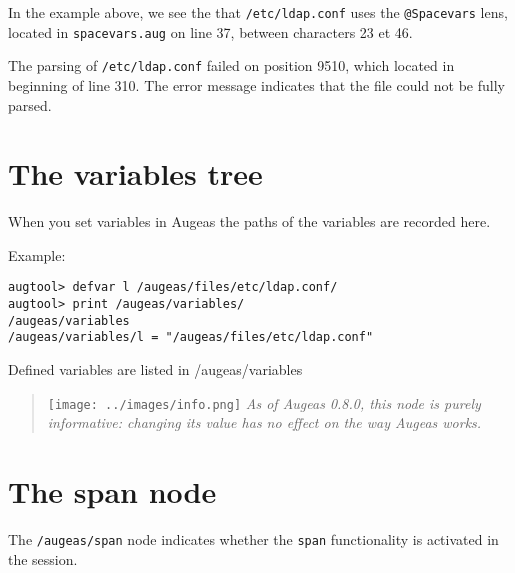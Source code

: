 In the example above, we see the that \nolinkurl{/etc/ldap.conf} uses the \verb!@Spacevars! lens, located in \verb!spacevars.aug! on line 37, between characters 23 et 46.

The parsing of \nolinkurl{/etc/ldap.conf} failed on position 9510, which located in beginning of line 310. The error message indicates that the file could not be fully parsed.


\section{The variables tree}

 

When you set variables in Augeas the paths of the variables are recorded here.

 

Example:

\begin{listing}
  \begin{verbatim}
augtool> defvar l /augeas/files/etc/ldap.conf/
augtool> print /augeas/variables/
/augeas/variables
/augeas/variables/l = "/augeas/files/etc/ldap.conf"
  \end{verbatim}
  \caption{Defined variables are listed in /augeas/variables}
  \label{lst:metadata_defvar}
\end{listing}

\begin{quote}
\texttt{[image: ../images/info.png]} \emph{As of Augeas 0.8.0, this node is purely informative: changing its value has no effect on the way Augeas works.}

\end{quote}
\section{The span node}

\label{sec:span_node}   

The \nolinkurl{/augeas/span} node indicates whether the \verb!span! functionality is activated in the session.

